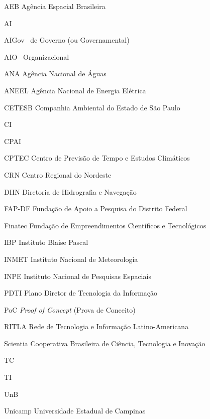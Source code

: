 
\begin{siglas}
    \item[AEB]Agência Espacial Brasileira
    \item[AI] \AI
    \item[AIGov]  \AI\ de Governo (ou Governamental)
    \item[AIO]\AI\ Organizacional
    \item[ANA]Agência Nacional de Águas
    \item[ANEEL]  Agência Nacional de Energia Elétrica
    \item[CETESB] Companhia Ambiental do Estado de São Paulo
    \item[CI] \CI
    \item[CPAI]   \CPAI
    \item[CPTEC]  Centro de Previsão de Tempo e Estudos Climáticos
    \item[CRN]Centro Regional do Nordeste
    \item[DHN]Diretoria de Hidrografia e Navegação
    \item[FAP-DF] Fundação de Apoio a Pesquisa do Distrito Federal
    \item[Finatec] Fundação de Empreendimentos Científicos e Tecnológicos
    \item[IBP]Instituto Blaise Pascal
    \item[INMET]  Instituto Nacional de Meteorologia
    \item[INPE]   Instituto Nacional de Pesquisas Espaciais
    \item[PDTI]   Plano Diretor de Tecnologia da Informação
    \item[PoC]\emph{Proof of Concept} (Prova de Conceito)
    \item[RITLA]  Rede de Tecnologia e Informação Latino-Americana
    \item[Scientia] Cooperativa Brasileira de Ciência, Tecnologia e Inovação
    \item[TC] \tr 
    \item[TI] \TI
    \item[UnB]\UnB
    \item[Unicamp] Universidade Estadual de Campinas
    
\end{siglas}


